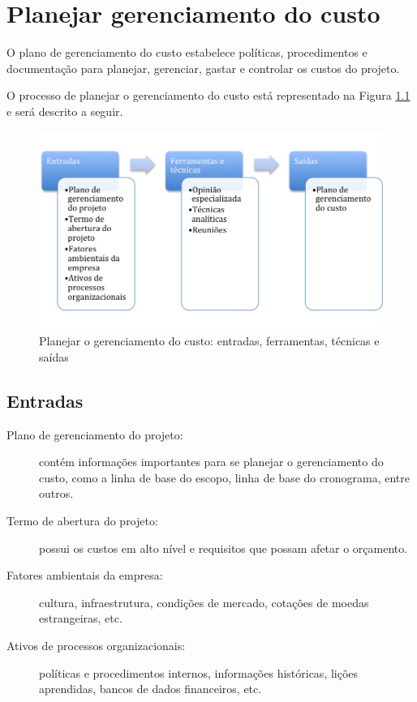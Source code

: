 \chapter{Planejar gerenciamento do custo}

O plano de gerenciamento do custo estabelece políticas, procedimentos e documentação para planejar, gerenciar, gastar e controlar os custos do projeto.

O processo de planejar o gerenciamento do custo está representado na Figura \ref{fig:custos:plan:efts} e será descrito a seguir.

\begin{figure}[!h]
	\centering
	\includegraphics[scale=0.5]{Figuras/custos_efts_planejar.png}
	\caption{Planejar o gerenciamento do custo: entradas, ferramentas, técnicas e saídas}
	\label{fig:custos:plan:efts}
\end{figure}

\section{Entradas}

\begin{description}
	
	\item[Plano de gerenciamento do projeto:] contém informações importantes para se planejar o gerenciamento do custo, como a linha de base do escopo, linha de base do cronograma, entre outros.

	\item[Termo de abertura do projeto:] possui os custos em alto nível e requisitos que possam afetar o orçamento.

	\item[Fatores ambientais da empresa:] cultura, infraestrutura, condições de mercado, cotações de moedas estrangeiras, etc.

	\item[Ativos de processos organizacionais:] políticas e procedimentos internos, informações históricas, lições aprendidas, bancos de dados financeiros, etc.

\end{description}

